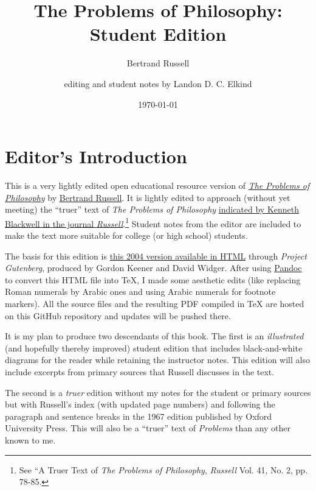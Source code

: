 \documentclass[oneside,letterpaper,12pt]{book}
\begin{document}
\title{The Problems of Philosophy: Student Edition}
\author{\doublespacing Bertrand Russell \and editing and student notes by Landon D. C. Elkind}
\date{\today}

\frontmatter

\maketitle

\chapter*{Editor's Introduction}
This is a very lightly edited open educational resource version of \href{https://archive.org/details/theproblemsofphi00russuoft}{\emph{The Problems of Philosophy}} by \href{https://bertrandrussellsociety.org/bertrand-russell/}{Bertrand Russell}. It is lightly edited to approach (without yet meeting) the ``truer'' text of \emph{The Problems of Philosophy} \href{https://mulpress.mcmaster.ca/russelljournal/article/view/4810}{indicated by Kenneth Blackwell in the journal \emph{Russell}}.\footnote{See ``A Truer Text of \emph{The Problems of Philosophy}, \emph{Russell} Vol. 41, No. 2, pp. 78-85.} Student notes from the editor are included to make the text more suitable for college (or high school) students. 

The basis for this edition is \href{https://www.gutenberg.org/cache/epub/5827/pg5827-images.html}{this 2004 version available in HTML} through \emph{Project Gutenberg}, produced by Gordon Keener and David Widger. After using \href{https://pandoc.org/}{Pandoc} to convert this HTML file into TeX, I made some aesthetic edits (like replacing Roman numerals by Arabic ones and using Arabic numerals for footnote markers). All the source files and the resulting PDF compiled in TeX are hosted on this GitHub repository and updates will be pushed there.

It is my plan to produce two descendants of this book. The first is an \emph{illustrated} (and hopefully thereby improved) student edition that includes black-and-white diagrams for the reader while retaining the instructor notes. This edition will also include excerpts from primary sources that Russell discusses in the text. 

The second is a \emph{truer} edition without my notes for the student or primary sources but with Russell's index (with updated page numbers) and following the paragraph and sentence breaks in the 1967 edition published by Oxford University Press. This will also be a ``truer'' text of \emph{Problems} than any other known to me. %
\end{document}
